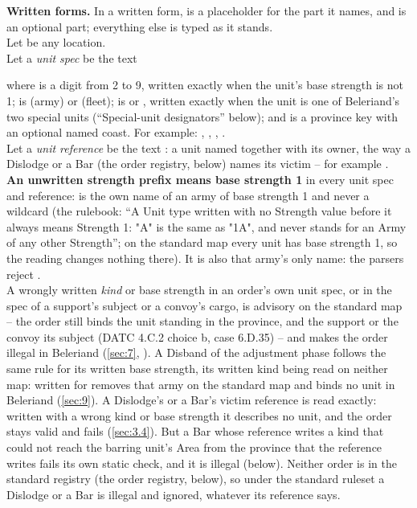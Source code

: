 \documentclass[12pt,a4paper]{article}
\begin{document}
\textbf{Written forms.}
In a written form, \order{<$\cdot$>} is a placeholder for the part it names, and \order{[$\cdot$]} is an optional part; everything else is typed as it stands.\\
Let  be any location.\\
Let a \emph{unit spec}  be the text
\begin{center}
\end{center}
where  is a digit from 2 to 9, written exactly when the unit's base strength is not 1;  is  (army) or  (fleet);  is  or , written exactly when the unit is one of Beleriand's two special units (``Special-unit designators'' below); and  is a province key with an optional named coast.
For example: , , , .\\
Let a \emph{unit reference} be the text : a unit named together with its owner, the way a Dislodge or a Bar (the order registry, below) names its victim -- for example .\\
\textbf{An unwritten strength prefix means base strength 1} in every unit spec and reference:  is the own name of an army of base strength 1 and never a wildcard (the rulebook: ``A Unit type written with no Strength value before it always means Strength 1: "A" is the same as "1A", and never stands for an Army of any other Strength''; on the standard map every unit has base strength 1, so the reading changes nothing there).
It is also that army's only name: the parsers reject .\\
A wrongly written \emph{kind} or base strength in an order's own unit spec, or in the spec of a support's subject or a convoy's cargo, is advisory on the standard map -- the order still binds the unit standing in the province, and the support or the convoy its subject (DATC 4.C.2 choice b, case 6.D.35) -- and makes the order illegal in Beleriand (\cref{sec:7}, ).
A Disband of the adjustment phase follows the same rule for its written base strength, its written kind being read on neither map:  written for  removes that army on the standard map and binds no unit in Beleriand (\cref{sec:9}).
A Dislodge's or a Bar's victim reference is read exactly: written with a wrong kind or base strength it describes no unit, and the order stays valid and fails (\cref{sec:3.4}).
But a Bar whose reference writes a kind that could not reach the barring unit's Area from the province that the reference writes fails its own static check, and it is illegal (below).
Neither order is in the standard registry (the order registry, below), so under the standard ruleset a Dislodge or a Bar is illegal and ignored, whatever its reference says.
\end{document}
